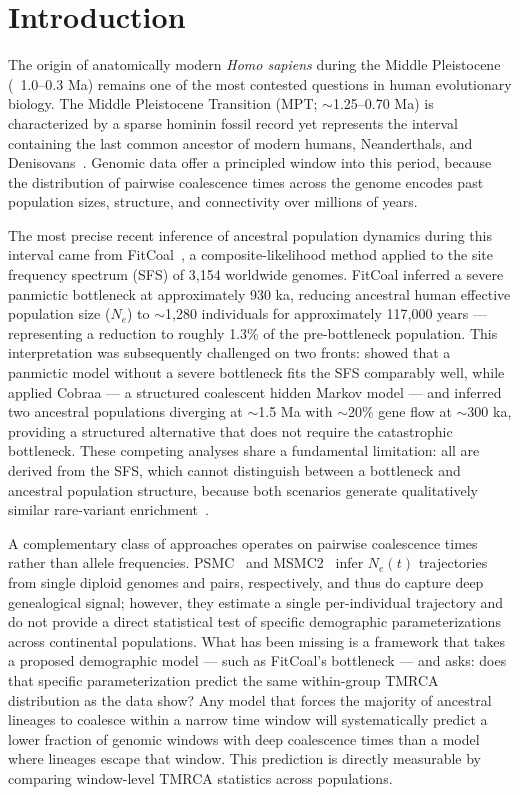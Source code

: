 
\section*{Introduction}

The origin of anatomically modern \textit{Homo sapiens} during the Middle Pleistocene (~1.0--0.3 Ma) remains one of the most contested questions in human evolutionary biology. The Middle Pleistocene Transition (MPT; $\sim$1.25--0.70 Ma) is characterized by a sparse hominin fossil record yet represents the interval containing the last common ancestor of modern humans, Neanderthals, and Denisovans~\citep{Stringer2016}. Genomic data offer a principled window into this period, because the distribution of pairwise coalescence times across the genome encodes past population sizes, structure, and connectivity over millions of years.

The most precise recent inference of ancestral population dynamics during this interval came from FitCoal~\citep{Hu2023}, a composite-likelihood method applied to the site frequency spectrum (SFS) of 3,154 worldwide genomes. FitCoal inferred a severe panmictic bottleneck at approximately 930 ka, reducing ancestral human effective population size ($N_e$) to $\sim$1,280 individuals for approximately 117,000 years --- representing a reduction to roughly 1.3\% of the pre-bottleneck population. This interpretation was subsequently challenged on two fronts: \citet{Cousins2025b} showed that a panmictic model without a severe bottleneck fits the SFS comparably well, while \citet{Cousins2025} applied Cobraa --- a structured coalescent hidden Markov model --- and inferred two ancestral populations diverging at $\sim$1.5 Ma with $\sim$20\% gene flow at $\sim$300 ka, providing a structured alternative that does not require the catastrophic bottleneck. These competing analyses share a fundamental limitation: all are derived from the SFS, which cannot distinguish between a bottleneck and ancestral population structure, because both scenarios generate qualitatively similar rare-variant enrichment~\citep{Cousins2025b,Myers2008}.

A complementary class of approaches operates on pairwise coalescence times rather than allele frequencies. PSMC~\citep{Li2011} and MSMC2~\citep{Schiffels2014} infer $N_e(t)$ trajectories from single diploid genomes and pairs, respectively, and thus do capture deep genealogical signal; however, they estimate a single per-individual trajectory and do not provide a direct statistical test of specific demographic parameterizations across continental populations. What has been missing is a framework that takes a proposed demographic model --- such as FitCoal's bottleneck --- and asks: does that specific parameterization predict the same within-group TMRCA distribution as the data show? Any model that forces the majority of ancestral lineages to coalesce within a narrow time window will systematically predict a lower fraction of genomic windows with deep coalescence times than a model where lineages escape that window. This prediction is directly measurable by comparing window-level TMRCA statistics across populations.

